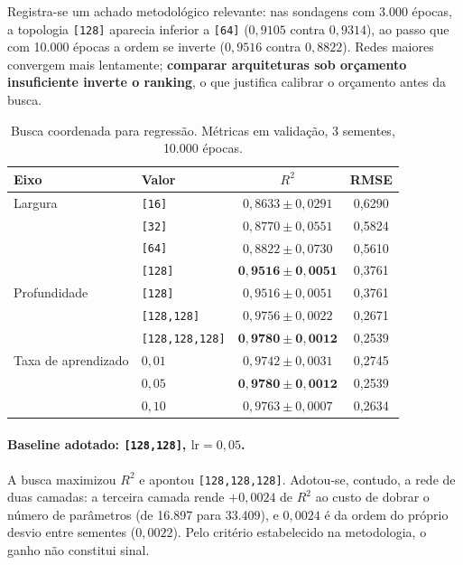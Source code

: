 \documentclass[11pt,a4paper]{article}
\begin{document}
Registra-se um achado metodológico relevante: nas sondagens com 3.000 épocas, a
topologia \texttt{[128]} aparecia inferior a \texttt{[64]} ($0{,}9105$ contra
$0{,}9314$), ao passo que com 10.000 épocas a ordem se inverte ($0{,}9516$ contra
$0{,}8822$). Redes maiores convergem mais lentamente; \textbf{comparar arquiteturas sob
orçamento insuficiente inverte o ranking}, o que justifica calibrar o orçamento antes
da busca.

\begin{table}[htbp]
\centering
\caption{Busca coordenada para regressão. Métricas em validação, 3 sementes, 10.000 épocas.}
\label{tab:reg-busca}
\begin{tabular}{llcc}
\toprule
Eixo & Valor & $R^2$ & RMSE \\
\midrule
Largura & \texttt{[16]} & $0{,}8633 \pm 0{,}0291$ & 0{,}6290 \\
        & \texttt{[32]} & $0{,}8770 \pm 0{,}0551$ & 0{,}5824 \\
        & \texttt{[64]} & $0{,}8822 \pm 0{,}0730$ & 0{,}5610 \\
        & \texttt{[128]} & $\mathbf{0{,}9516 \pm 0{,}0051}$ & 0{,}3761 \\
\midrule
Profundidade & \texttt{[128]} & $0{,}9516 \pm 0{,}0051$ & 0{,}3761 \\
             & \texttt{[128,128]} & $0{,}9756 \pm 0{,}0022$ & 0{,}2671 \\
             & \texttt{[128,128,128]} & $\mathbf{0{,}9780 \pm 0{,}0012}$ & 0{,}2539 \\
\midrule
Taxa de aprendizado & $0{,}01$ & $0{,}9742 \pm 0{,}0031$ & 0{,}2745 \\
                    & $0{,}05$ & $\mathbf{0{,}9780 \pm 0{,}0012}$ & 0{,}2539 \\
                    & $0{,}10$ & $0{,}9763 \pm 0{,}0007$ & 0{,}2634 \\
\bottomrule
\end{tabular}
\end{table}

\paragraph{Baseline adotado: \texttt{[128,128]}, $\text{lr}=0{,}05$.} A busca maximizou
$R^2$ e apontou \texttt{[128,128,128]}. Adotou-se, contudo, a rede de duas camadas: a
terceira camada rende $+0{,}0024$ de $R^2$ ao custo de dobrar o número de parâmetros
(de 16.897 para 33.409), e $0{,}0024$ é da ordem do próprio desvio entre sementes
($0{,}0022$). Pelo critério estabelecido na metodologia, o ganho não constitui sinal.
\end{document}
